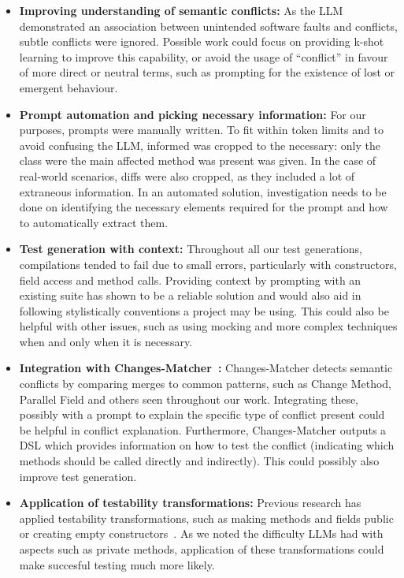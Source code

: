 \begin{itemize}
\item \textbf{Improving understanding of semantic conflicts:} As the LLM demonstrated an association between unintended software faults and conflicts, subtle conflicts were ignored.
Possible work could focus on providing k-shot learning to improve this capability, or avoid the usage of ``conflict'' in favour of more direct or neutral terms, such as prompting
for the existence of lost or emergent behaviour.

\item \textbf{Prompt automation and picking necessary information:} For our purposes, prompts were manually written. To fit within token limits and to avoid confusing the LLM, informed was cropped to
the necessary: only the class were the main affected method was present was given. In the case of real-world scenarios, diffs were also cropped, as they included a lot of extraneous information.
In an automated solution, investigation needs to be done on identifying the necessary elements required for the prompt and how to automatically extract them.

\item \textbf{Test generation with context:} Throughout all our test generations, compilations tended to fail due to small errors, particularly with constructors, field access and method calls.
Providing context by prompting with an existing suite has shown to be a reliable solution and would also aid in following stylistically conventions a project may be using.
This could also be helpful with other issues, such as using mocking and more complex techniques when and only when it is necessary.

\item \textbf{Integration with Changes-Matcher~\cite{kn:nuno}:} Changes-Matcher detects semantic conflicts by comparing merges to common patterns, such as Change Method, Parallel Field and others
seen throughout our work. Integrating these, possibly with a prompt to explain the specific type of conflict present could be helpful in conflict explanation.
Furthermore, Changes-Matcher outputs a DSL which provides information on how to test the conflict (indicating which methods should be called directly and indirectly). This could possibly
also improve test generation.

\item \textbf{Application of testability transformations:} Previous research has applied testability transformations, such as making methods and fields public or creating empty constructors~\cite{kn:leuson}.
As we noted the difficulty LLMs had with aspects such as private methods, application of these transformations could make succesful testing much more likely.
\end{itemize}

